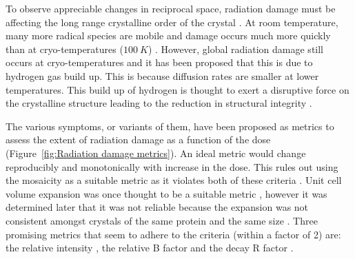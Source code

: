         To observe appreciable changes in reciprocal space, radiation damage must be affecting the long range crystalline order of the crystal \cite{meents2010}.
        At room temperature, many more radical species are mobile and damage occurs much more quickly than at cryo-temperatures ($100\ K$) \cite{henderson1990cryo,weik2010temperature}.
        However, global radiation damage still occurs at cryo-temperatures and it has been proposed that this is due to hydrogen gas build up.
		This is because diffusion rates are smaller at lower temperatures.
		This build up of hydrogen is thought to exert a disruptive force on the crystalline structure leading to the reduction in structural integrity \cite{meents2010}.

        The various symptoms, or variants of them, have been proposed as metrics to assess the extent of radiation damage as a function of the dose (Figure~\ref{fig:Radiation damage metrics}).
        An ideal metric would change reproducibly and monotonically with increase in the dose.
        This rules out using the mosaicity as a suitable metric as it violates both of these criteria \cite{garman2010}.
        Unit cell volume expansion was once thought to be a suitable metric \cite{ravelli2002}, however it was determined later that it was not reliable because the expansion was not consistent amongst crystals of the same protein and the same size \cite{murray2002}.
        Three promising metrics that seem to adhere to the criteria (within a factor of 2) are: the relative intensity \cite{owen2006}, the relative B factor \cite{kmetko2006} and the decay R factor \cite{diederichs2006}.


